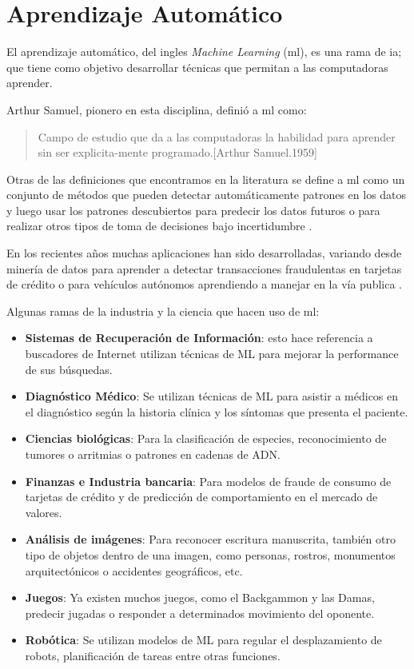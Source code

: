 \section{Aprendizaje Automático}\label{sec:aprendizajeautomatico}
El aprendizaje automático, del ingles \textit{Machine Learning} (\ac{ml}), es  una rama de \ac{ia}; que tiene como objetivo desarrollar técnicas que permitan a las computadoras aprender. 

Arthur Samuel, pionero en esta disciplina, definió a \ac{ml} como:
\begin{quote}\centering
 Campo de estudio que da a las computadoras la habilidad para aprender sin ser explicita-mente programado.[Arthur Samuel.1959]
\end{quote}

Otras de las definiciones que encontramos en la literatura se define a \ac{ml} como un conjunto de métodos que pueden detectar automáticamente patrones en los datos y luego usar los patrones descubiertos para predecir los datos futuros o para realizar otros tipos de toma de decisiones bajo incertidumbre \citep{murphy}.

En los recientes años muchas aplicaciones han sido desarrolladas, variando desde minería de datos para aprender a detectar transacciones fraudulentas en tarjetas de crédito o para vehículos autónomos aprendiendo a manejar en la vía publica \citep{Mitchell}.

Algunas ramas de la industria y la ciencia que hacen uso de \ac{ml}:

\begin{itemize}
    \item \textbf{Sistemas de Recuperación de Información}: esto hace referencia a buscadores de Internet utilizan técnicas de ML para mejorar la performance de sus búsquedas.
    \item\textbf{ Diagnóstico Médico}: Se utilizan técnicas de ML para asistir a médicos en el diagnóstico según la historia clínica y los síntomas que presenta el paciente.
    \item \textbf{Ciencias biológicas}: Para la clasificación de especies, reconocimiento de tumores o arritmias o patrones en cadenas de ADN. 
    \item \textbf{Finanzas e Industria bancaria}: Para modelos de fraude de consumo de tarjetas de crédito y de predicción de comportamiento en el mercado de valores.
    \item \textbf{Análisis de imágenes}: Para reconocer escritura manuscrita, también otro tipo de objetos dentro de una imagen, como personas, rostros, monumentos arquitectónicos 
o accidentes geográficos, etc.
     \item \textbf{Juegos}: Ya existen muchos juegos, como el Backgammon y las Damas, predecir jugadas o responder a determinados movimiento del oponente.
     \item \textbf{Robótica}: Se utilizan modelos de ML para regular el desplazamiento de robots, planificación de tareas entre otras funciones.	
\end{itemize}


